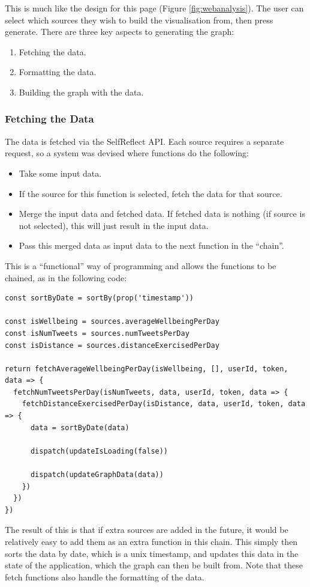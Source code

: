 \documentclass[11pt,openright,a4paper]{report}
\begin{document}
This is much like the design for this page (Figure \ref{fig:webanalysis}). The user can select which sources they wish to build the visualisation from, then press generate. There are three key aspects to generating the graph:
\begin{enumerate}
\item Fetching the data.
\item Formatting the data.
\item Building the graph with the data.
\end{enumerate}

\subsubsection{Fetching the Data}
The data is fetched via the SelfReflect API. Each source requires a separate request, so a system was devised where functions do the following:
\begin{itemize}
\item Take some input data.
\item If the source for this function is selected, fetch the data for that source.
\item Merge the input data and fetched data. If fetched data is nothing (if source is not selected), this will just result in the input data.
\item Pass this merged data as input data to the next function in the \enquote{chain}.
\end{itemize}
This is a \enquote{functional} way of programming and allows the functions to be chained, as in the following code:
\begin{lstlisting}
const sortByDate = sortBy(prop('timestamp'))

const isWellbeing = sources.averageWellbeingPerDay
const isNumTweets = sources.numTweetsPerDay
const isDistance = sources.distanceExercisedPerDay

return fetchAverageWellbeingPerDay(isWellbeing, [], userId, token, data => {
  fetchNumTweetsPerDay(isNumTweets, data, userId, token, data => {
    fetchDistanceExercisedPerDay(isDistance, data, userId, token, data => {
      data = sortByDate(data)

      dispatch(updateIsLoading(false))

      dispatch(updateGraphData(data))
    })
  })
})
\end{lstlisting}

The result of this is that if extra sources are added in the future, it would be relatively easy to add them as an extra function in this chain. This simply then sorts the data by date, which is a unix timestamp, and updates this data in the state of the application, which the graph can then be built from. Note that these fetch functions also handle the formatting of the data.
\end{document}
